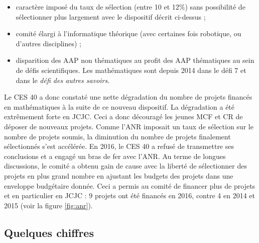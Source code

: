 \begin{itemize}
\item caract\`ere impos\'e du taux de s\'election (entre 10 et 12\%) sans possibilit\'e de s\'electionner plus largement avec le dispositif d\'ecrit ci-dessus ;
\item comit\'e \'elargi \`a l'informatique th\'eorique (avec certaines fois robotique, ou d'autres disciplines) ;
\item disparition des AAP non th\'ematiques au profit des AAP th\'ematiques au sein de d\'efis scientifiques. Les math\'ematiques sont depuis 2014 dans le d\'efi 7 et dans le {\em d\'efi des autres savoirs}.
\end{itemize}

Le CES 40 a donc constat\'e une nette d\'egradation du nombre de projets financ\'es en math\'ematiques \`a la suite de ce nouveau dispositif. La d\'egradation a \'et\'e extr\^emement forte en JCJC. Ceci a donc d\'ecourag\'e les jeunes MCF et CR de d\'eposer de nouveaux projets. Comme l'ANR imposait un taux de s\'election sur le nombre de projets soumis, la diminution du nombre de projets finalement s\'electionn\'es s'est acc\'el\'er\'ee. En 2016, le CES 40 a refus\'e de transmettre ses conclusions et a engag\'e un bras de fer avec l'ANR. Au terme de longues discussions, le comit\'e a obtenu gain de cause avec la libert\'e de s\'electionner des projets en plus grand nombre en ajustant les budgets des projets dans une enveloppe budg\'etaire donn\'ee. Ceci a permis au comit\'e de financer plus de projets et en particulier en JCJC : 9 projets ont \'et\'e financ\'es en 2016, contre 4 en 2014 et 2015 (voir la figure \ref{fig:anr}).

\subsection*{Quelques chiffres}

